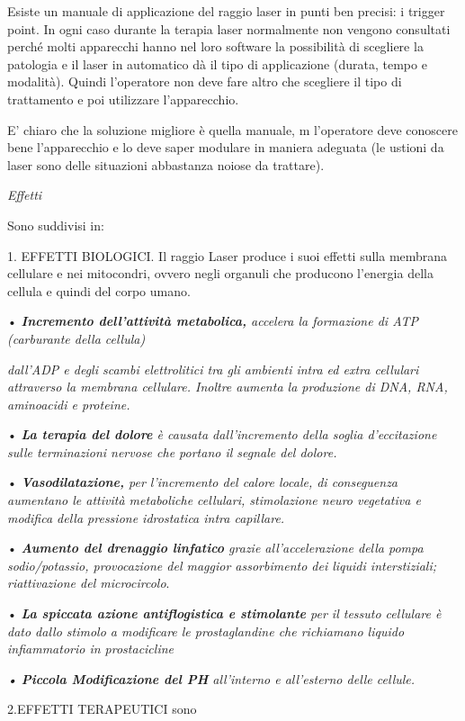 \documentclass[]{article}
\begin{document}
Esiste un manuale di applicazione del raggio laser in punti ben precisi:
i trigger point. In ogni caso durante la terapia laser normalmente non
vengono consultati perché molti apparecchi hanno nel loro software la
possibilità di scegliere la patologia e il laser in automatico dà il
tipo di applicazione (durata, tempo e modalità). Quindi l'operatore non
deve fare altro che scegliere il tipo di trattamento e poi utilizzare
l'apparecchio.

E' chiaro che la soluzione migliore è quella manuale, m l'operatore deve
conoscere bene l'apparecchio e lo deve saper modulare in maniera
adeguata (le ustioni da laser sono delle situazioni abbastanza noiose da
trattare).

\emph{Effetti}

Sono suddivisi in:

1. EFFETTI BIOLOGICI. Il raggio Laser produce i suoi effetti sulla
membrana cellulare e nei mitocondri, ovvero negli organuli che producono
l'energia della cellula e quindi del corpo umano.

• \emph{\textbf{Incremento dell'attività metabolica,} accelera la
formazione di ATP (carburante della cellula)}

\emph{dall'ADP e degli scambi elettrolitici tra gli ambienti intra ed
extra cellulari attraverso la membrana cellulare. Inoltre aumenta la
produzione di DNA, RNA, aminoacidi e proteine.}

• \emph{\textbf{La terapia del dolore} è causata dall'incremento della
soglia d'eccitazione sulle terminazioni nervose che portano il segnale
del dolore.}

• \emph{\textbf{Vasodilatazione,} per l'incremento del calore locale, di
conseguenza aumentano le attività metaboliche cellulari, stimolazione
neuro vegetativa e modifica della pressione idrostatica intra
capillare.}

• \emph{\textbf{Aumento del drenaggio linfatico} grazie
all'accelerazione della pompa sodio/potassio, provocazione del maggior
assorbimento dei liquidi interstiziali; riattivazione del microcircolo}.

• \emph{\textbf{La spiccata azione antiflogistica e stimolante} per il
tessuto cellulare è dato dallo stimolo a modificare le prostaglandine
che richiamano liquido infiammatorio in prostacicline}

\emph{• \textbf{Piccola Modificazione del PH} all'interno e all'esterno
delle cellule.}

2.EFFETTI TERAPEUTICI sono
\end{document}
